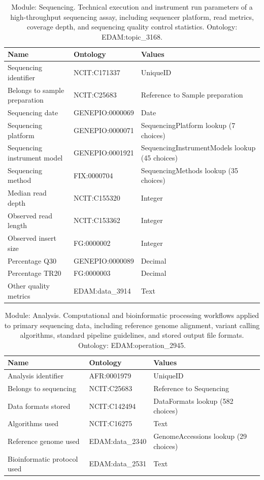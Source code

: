 \documentclass{article}
\begin{document}
\begin{table}[htb]
\begin{tabular}{lll}
Name & Ontology & Values \\
\hline
Sequencing identifier & NCIT:C171337 & UniqueID \\
Belongs to sample preparation & NCIT:C25683 & Reference to Sample preparation \\
Sequencing date & GENEPIO:0000069 & Date \\
Sequencing platform & GENEPIO:0000071 & SequencingPlatform lookup (7 choices) \\
Sequencing instrument model & GENEPIO:0001921 & SequencingInstrumentModels lookup (45 choices) \\
Sequencing method & FIX:0000704 & SequencingMethods lookup (35 choices) \\
Median read depth & NCIT:C155320 & Integer \\
Observed read length & NCIT:C153362 & Integer \\
Observed insert size & FG:0000002 & Integer \\
Percentage Q30 & GENEPIO:0000089 & Decimal \\
Percentage TR20 & FG:0000003 & Decimal \\
Other quality metrics & EDAM:data\_3914 & Text \\
\hline
\end{tabular}
\caption[Module: Sequencing]{\label{table:table12} Module: Sequencing. Technical execution and instrument run parameters of a high-throughput sequencing assay, including sequencer platform, read metrics, coverage depth, and sequencing quality control statistics. Ontology: EDAM:topic\_3168. }
\end{table}

\begin{table}[htb]
\begin{tabular}{lll}
Name & Ontology & Values \\
\hline
Analysis identifier & AFR:0001979 & UniqueID \\
Belongs to sequencing & NCIT:C25683 & Reference to Sequencing \\
Data formats stored & NCIT:C142494 & DataFormats lookup (582 choices) \\
Algorithms used & NCIT:C16275 & Text \\
Reference genome used & EDAM:data\_2340 & GenomeAccessions lookup (29 choices) \\
Bioinformatic protocol used & EDAM:data\_2531 & Text \\
\hline
\end{tabular}
\caption[Module: Analysis]{\label{table:table13} Module: Analysis. Computational and bioinformatic processing workflows applied to primary sequencing data, including reference genome alignment, variant calling algorithms, standard pipeline guidelines, and stored output file formats. Ontology: EDAM:operation\_2945. }
\end{table}
\end{document}
